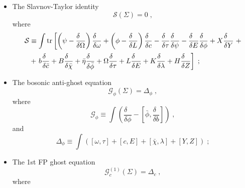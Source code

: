 \documentclass[../main.tex]{subfiles}
\begin{document}
\begin{itemize}
  \item  The Slavnov-Taylor identity
        \begin{equation}
          \label{eq:st-identity}
          \mathcal{S}\left(\Sigma\right)=0 \;,
        \end{equation}
        where
        \begin{align}
          \label{eq:SToperator}
          \mathcal{S} & \equiv \int \tr\left[\left(\psi-\frac{\delta\phantom{\Omega}}{\delta\Omega}\right)\frac{\delta\phantom{\omega }}{\delta \omega }+\left(\phi-\frac{\delta\phantom{L}}{\delta L}\right)\frac{\delta\phantom{c}}{\delta c}-\frac{\delta\phantom{\tau}}{\delta\tau}\frac{\delta\phantom{\psi}}{\delta\psi}-\frac{\delta\phantom{E}}{\delta E}\frac{\delta\phantom{\phi}}{\delta\phi}+X\frac{\delta\phantom{Y}}{\delta Y} \right. + \nonumber \\
                      & + \left. b\frac{\delta\phantom{\bar{c}}}{\delta\bar{c}}+B\frac{\delta\phantom{\bar{\chi}}}{\delta\bar{\chi}}+\bar{\eta}\frac{\delta\phantom{\bar{\phi}}}{\delta\bar{\phi}} + \Omega \frac{\delta\phantom{\tau}}{\delta\tau}+L\frac{\delta\phantom{E}}{\delta E}+K\frac{\delta\phantom{\lambda}}{\delta\lambda}+H\frac{\delta\phantom{Z}}{\delta Z}\right] \;;
        \end{align}
  \item The bosonic anti-ghost equation
        \begin{equation}
          \mathcal{G}_\phi \left(\Sigma\right) = \Delta_\phi \;,
        \end{equation}
        where
        \begin{equation}
          \mathcal{G}_\phi \equiv \int \left(\frac{\delta\phantom{\phi}}{\delta\phi}-\left[\bar{\phi},\frac{\delta\phantom{b}}{\delta b}\right]\right) \;,
        \end{equation}
        and
        \begin{equation}
          \label{eq:linearbreakphi}
          \Delta_\phi \equiv \int \left(\left[\omega ,\tau\right]+\left[c,E\right]+\left[\bar{\chi},\lambda\right]+\left[Y,Z\right]\right) \;;
        \end{equation}
  \item The 1st FP ghost equation
        \begin{equation}
          \label{eq:1stfpghosteq}
          \mathcal{G}^{\left(1\right)}_c \left(\Sigma\right)=\Delta_c \;,
        \end{equation}
        where
        \begin{align}

\end{align}
\end{itemize}
\end{document}
